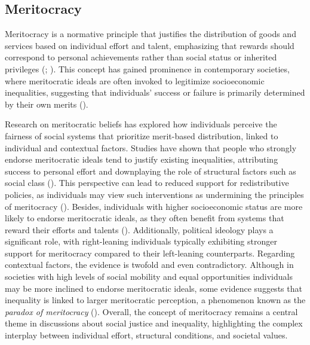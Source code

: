 \documentclass[
  12pt,
]{article}
\begin{document}
\subsection{Meritocracy}\label{meritocracy}

Meritocracy is a normative principle that justifies the distribution of
goods and services based on individual effort and talent, emphasizing
that rewards should correspond to personal achievements rather than
social status or inherited privileges
(;
). This concept has gained
prominence in contemporary societies, where meritocratic ideals are
often invoked to legitimize socioeconomic inequalities, suggesting that
individuals' success or failure is primarily determined by their own
merits ().

Research on meritocratic beliefs has explored how individuals perceive
the fairness of social systems that prioritize merit-based distribution,
linked to individual and contextual factors. Studies have shown that
people who strongly endorse meritocratic ideals tend to justify existing
inequalities, attributing success to personal effort and downplaying the
role of structural factors such as social class
(). This
perspective can lead to reduced support for redistributive policies, as
individuals may view such interventions as undermining the principles of
meritocracy ().
Besides, individuals with higher socioeconomic status are more likely to
endorse meritocratic ideals, as they often benefit from systems that
reward their efforts and talents
().
Additionally, political ideology plays a significant role, with
right-leaning individuals typically exhibiting stronger support for
meritocracy compared to their left-leaning counterparts. Regarding
contextual factors, the evidence is twofold and even contradictory.
Although in societies with high levels of social mobility and equal
opportunities individuals may be more inclined to endorse meritocratic
ideals, some evidence suggests that inequality is linked to larger
meritocratic perception, a phenomenon known as the \emph{paradox of
meritocracy} (). Overall,
the concept of meritocracy remains a central theme in discussions about
social justice and inequality, highlighting the complex interplay
between individual effort, structural conditions, and societal values.
\end{document}
